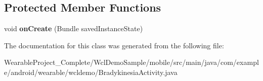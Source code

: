 \subsection*{Protected Member Functions}
\begin{DoxyCompactItemize}
\item 
void {\bfseries on\+Create} (Bundle saved\+Instance\+State)\hypertarget{classcom_1_1example_1_1android_1_1wearable_1_1wcldemo_1_1BradykinesiaActivity_a4302240214033e7df45e3c2d57bd8098}{}\label{classcom_1_1example_1_1android_1_1wearable_1_1wcldemo_1_1BradykinesiaActivity_a4302240214033e7df45e3c2d57bd8098}

\end{DoxyCompactItemize}


The documentation for this class was generated from the following file\+:\begin{DoxyCompactItemize}
\item 
Wearable\+Project\+\_\+\+Complete/\+Wcl\+Demo\+Sample/mobile/src/main/java/com/example/android/wearable/wcldemo/Bradykinesia\+Activity.\+java\end{DoxyCompactItemize}
